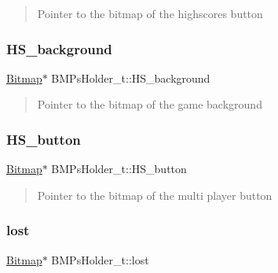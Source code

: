 \begin{quote}
Pointer to the bitmap of the highscores button \end{quote}


\hypertarget{struct_b_m_ps_holder__t_a2f28777b77117387410c5e20ff925c44}{}\label{struct_b_m_ps_holder__t_a2f28777b77117387410c5e20ff925c44} 
\subsubsection{\texorpdfstring{H\+S\+\_\+background}{HS\_background}}
{\footnotesize\ttfamily \hyperlink{struct_bitmap}{Bitmap}$\ast$ B\+M\+Ps\+Holder\+\_\+t\+::\+H\+S\+\_\+background}



\begin{quote}
Pointer to the bitmap of the game background \end{quote}


\hypertarget{struct_b_m_ps_holder__t_af7900570e309f23ad946097469181db9}{}\label{struct_b_m_ps_holder__t_af7900570e309f23ad946097469181db9} 
\subsubsection{\texorpdfstring{H\+S\+\_\+button}{HS\_button}}
{\footnotesize\ttfamily \hyperlink{struct_bitmap}{Bitmap}$\ast$ B\+M\+Ps\+Holder\+\_\+t\+::\+H\+S\+\_\+button}



\begin{quote}
Pointer to the bitmap of the multi player button \end{quote}


\hypertarget{struct_b_m_ps_holder__t_a45ecec1d2762f2fd9f9ccc6ffc0cdbf6}{}\label{struct_b_m_ps_holder__t_a45ecec1d2762f2fd9f9ccc6ffc0cdbf6} 
\subsubsection{\texorpdfstring{lost}{lost}}
{\footnotesize\ttfamily \hyperlink{struct_bitmap}{Bitmap}$\ast$ B\+M\+Ps\+Holder\+\_\+t\+::lost}



